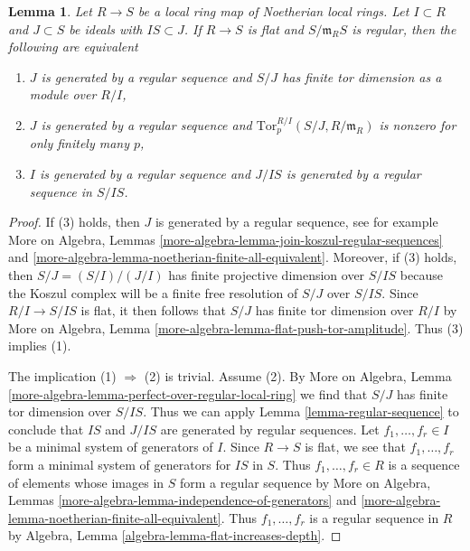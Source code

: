 \documentclass{stacks-project}
\theoremstyle{plain}
\newtheorem{lemma}[subsection]{Lemma}
\theoremstyle{definition}
\theoremstyle{remark}
\numberwithin{equation}{subsection}
\begin{document}
\begin{lemma}
\label{lemma-perfect-map-ci}
Let $R \to S$ be a local ring map of Noetherian local rings.
Let $I \subset R$ and $J \subset S$ be ideals with
$IS \subset J$. If $R \to S$ is flat and $S/\mathfrak m_RS$ is
regular, then the following are equivalent
\begin{enumerate}
\item $J$ is generated by a regular sequence and
$S/J$ has finite tor dimension as a module over $R/I$,
\item $J$ is generated by a regular sequence and
$\text{Tor}^{R/I}_p(S/J, R/\mathfrak m_R)$ is nonzero
for only finitely many $p$,
\item $I$ is generated by a regular sequence
and $J/IS$ is generated by a regular sequence in $S/IS$.
\end{enumerate}
\end{lemma}

\begin{proof}
If (3) holds, then $J$ is generated by a regular sequence, see for example
More on Algebra, Lemmas
\ref{more-algebra-lemma-join-koszul-regular-sequences} and
\ref{more-algebra-lemma-noetherian-finite-all-equivalent}.
Moreover, if (3) holds, then $S/J = (S/I)/(J/I)$
has finite projective dimension over $S/IS$ because the Koszul
complex will be a finite free resolution of $S/J$ over $S/IS$.
Since $R/I \to S/IS$ is flat, it then follows that $S/J$ has finite
tor dimension over $R/I$ by
More on Algebra, Lemma \ref{more-algebra-lemma-flat-push-tor-amplitude}.
Thus (3) implies (1).

\medskip\noindent
The implication (1) $\Rightarrow$ (2) is trivial.
Assume (2). By
More on Algebra, Lemma \ref{more-algebra-lemma-perfect-over-regular-local-ring}
we find that $S/J$ has finite tor dimension over $S/IS$.
Thus we can apply Lemma \ref{lemma-regular-sequence}
to conclude that $IS$ and $J/IS$ are generated by regular sequences.
Let $f_1, \ldots, f_r \in I$ be a minimal system of generators of $I$.
Since $R \to S$ is flat, we see that $f_1, \ldots, f_r$ form a minimal
system of generators for $IS$ in $S$. Thus $f_1, \ldots, f_r \in R$
is a sequence of elements whose images in $S$ form a regular sequence
by More on Algebra, Lemmas
\ref{more-algebra-lemma-independence-of-generators} and
\ref{more-algebra-lemma-noetherian-finite-all-equivalent}.
Thus $f_1, \ldots, f_r$ is a regular sequence in $R$ by
Algebra, Lemma \ref{algebra-lemma-flat-increases-depth}.
\end{proof}
\end{document}
